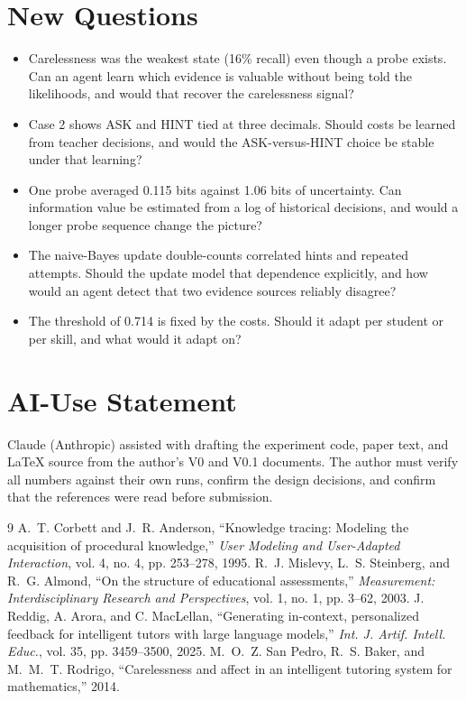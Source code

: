 \documentclass[10pt,letterpaper,twocolumn]{article}
\begin{document}
\section{New Questions}
\begin{itemize}[leftmargin=1.2em]
\item Carelessness was the weakest state (16\% recall) even though a probe exists. Can an agent learn which evidence is valuable without being told the likelihoods, and would that recover the carelessness signal?
\item Case 2 shows ASK and HINT tied at three decimals. Should costs be learned from teacher decisions, and would the ASK-versus-HINT choice be stable under that learning?
\item One probe averaged 0.115 bits against 1.06 bits of uncertainty. Can information value be estimated from a log of historical decisions, and would a longer probe sequence change the picture?
\item The naive-Bayes update double-counts correlated hints and repeated attempts. Should the update model that dependence explicitly, and how would an agent detect that two evidence sources reliably disagree?
\item The threshold of 0.714 is fixed by the costs. Should it adapt per student or per skill, and what would it adapt on?
\end{itemize}

\section*{AI-Use Statement}
Claude (Anthropic) assisted with drafting the experiment code, paper text, and LaTeX source from the author's V0 and V0.1 documents. The author must verify all numbers against their own runs, confirm the design decisions, and confirm that the references were read before submission.

\begin{thebibliography}{9}
 A.~T. Corbett and J.~R. Anderson, ``Knowledge tracing: Modeling the acquisition of procedural knowledge,'' \emph{User Modeling and User-Adapted Interaction}, vol. 4, no. 4, pp. 253--278, 1995.
 R.~J. Mislevy, L.~S. Steinberg, and R.~G. Almond, ``On the structure of educational assessments,'' \emph{Measurement: Interdisciplinary Research and Perspectives}, vol. 1, no. 1, pp. 3--62, 2003.
 J. Reddig, A. Arora, and C. MacLellan, ``Generating in-context, personalized feedback for intelligent tutors with large language models,'' \emph{Int. J. Artif. Intell. Educ.}, vol. 35, pp. 3459--3500, 2025.
 M.~O.~Z. San Pedro, R.~S. Baker, and M.~M.~T. Rodrigo, ``Carelessness and affect in an intelligent tutoring system for mathematics,'' 2014.
\end{thebibliography}
\end{document}
